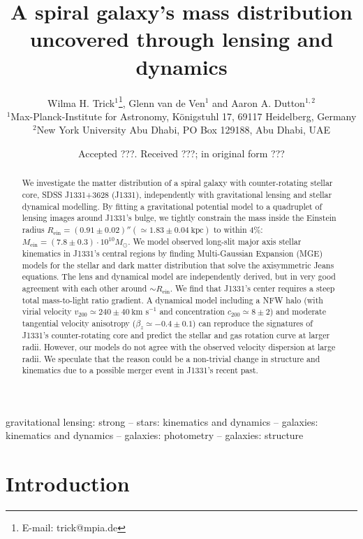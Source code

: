 \documentclass[useAMS,usenatbib]{mnras}
\title[A spiral galaxy's mass distribution uncovered]{A spiral galaxy's mass distribution uncovered through lensing and dynamics}
\author[W.H. Trick, G. van de Ven and A.A. Dutton]{Wilma H. Trick$^{1}$\thanks{E-mail: trick@mpia.de}, Glenn van de Ven$^{1}$ and Aaron A. Dutton$^{1,2}$\\
$^{1}$Max-Planck-Institute for Astronomy, K\"{o}nigstuhl 17, 69117 Heidelberg, Germany\\
$^{2}$New York University Abu Dhabi, PO Box 129188, Abu Dhabi, UAE\\}
\begin{document}
\date{Accepted ???. Received ???; in original form ???}

\pagerange{\pageref{firstpage}--\pageref{lastpage}} 

\maketitle

\label{firstpage}

\begin{abstract}
We investigate the matter distribution of a spiral galaxy with counter-rotating stellar core, SDSS J1331+3628 (J1331), independently with gravitational lensing and stellar dynamical modelling. By fitting a gravitational potential model to a quadruplet of lensing images around J1331's bulge, we tightly constrain the mass inside the Einstein radius $R_\text{ein}=(0.91\pm0.02)''(\simeq1.83\pm0.04~\text{kpc})$ to within 4\%: $M_\text{ein} = (7.8\pm0.3) \cdot 10^{10} M_\odot$. We model observed long-slit major axis stellar kinematics in J1331's central regions by finding Multi-Gaussian Expansion (MGE) models for the stellar and dark matter distribution that solve the axisymmetric Jeans equations. The lens and dynamical model are independently derived, but in very good agreement with each other around $\sim R_\text{ein}$. We find that J1331's center requires a steep total mass-to-light ratio gradient. A dynamical model including a NFW halo (with virial velocity $v_{200} \simeq 240 \pm 40~\text{km s}^{-1}$ and concentration $c_{200} \simeq 8 \pm 2$) and moderate tangential velocity anisotropy ($\beta_z \simeq -0.4 \pm 0.1$) can reproduce the signatures of J1331's counter-rotating core and predict the stellar and gas rotation curve at larger radii. However, our models do not agree with the observed velocity dispersion at large radii. We speculate that the reason could be a non-trivial change in structure and kinematics due to a possible merger event in J1331's recent past.
\end{abstract}

\begin{keywords}
gravitational lensing: strong -- stars: kinematics and dynamics -- galaxies: kinematics and dynamics -- galaxies: photometry -- galaxies: structure
\end{keywords}

\section{Introduction}
\end{document}

